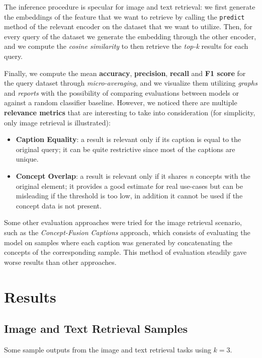 \documentclass[10pt,twocolumn,letterpaper]{article}
\begin{document}
The inference procedure is specular for image and text retrieval: we first generate the embeddings of the feature that we want to retrieve by calling the \texttt{predict} method of the relevant encoder on the dataset that we want to utilize.
Then, for every query of the dataset we generate the embedding through the other encoder, and we compute the \textit{cosine similarity} to then retrieve the \textit{top-k} results for each query.

Finally, we compute the mean \textbf{accuracy}, \textbf{precision}, \textbf{recall} and \textbf{F1 score} for the query dataset through \textit{micro-averaging}, and we visualize them utilizing \textit{graphs} and \textit{reports} with the possibility of comparing evaluations between models or against a random classifier baseline.
However, we noticed there are multiple \textbf{relevance metrics} that are interesting to take into consideration (for simplicity, only image retrieval is illustrated):
\begin{itemize}
   \item \textbf{Caption Equality}: a result is relevant only if its caption is equal to the original query; it can be quite restrictive since most of the captions are unique.
   \item \textbf{Concept Overlap}: a result is relevant only if it shares \textit{n} concepts with the original element; it provides a good estimate for real use-cases but can be misleading if the threshold is too low, in addition it cannot be used if the concept data is not present.
\end{itemize}

Some other evaluation approaches were tried for the image retrieval scenario, such as the \textit{Concept-Fusion Captions} approach, which consists of evaluating the model on samples where each caption was generated by concatenating the concepts of the corresponding sample.
This method of evaluation steadily gave worse results than other approaches.


\section{Results}

\subsection{Image and Text Retrieval Samples}
Some sample outputs from the image and text retrieval tasks using $k=3$.
\end{document}
